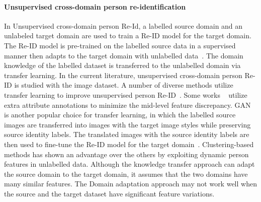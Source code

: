 \documentclass[a4paper,fleqn]{cas-dc}
\begin{document}
\paragraph{Unsupervised cross-domain person re-identification}
In Unsupervised cross-domain person Re-Id, a labelled source domain and an unlabeled target domain are used to train a Re-ID model for the target domain. The Re-ID model is pre-trained on the labelled source data in a supervised manner then adapts to the target domain with unlabelled data~\cite{fan_unsupervised_2018,fu_self-similarity_2019}. The domain knowledge of the labelled dataset is transferred to the unlabelled domain via transfer learning. In the current literature, unsupervised cross-domain person Re-ID is studied with the image dataset. A number of diverse methods  utilize transfer learning to improve unsupervised person Re-ID~\cite{lin_multi-task_2018,wang_transferable_2018,yu_unsupervised_2019,wei_person_2018,deng_image-image_2018,zhong_generalizing_2018,zhong_invariance_2019,chen_instance-guided_2019,wu_unsupervised_2019,li_cross-dataset_2019,qi_novel_2019,zhang_self-training_2019}. Some works ~\cite{lin_multi-task_2018,wang_transferable_2018} utilize extra attribute annotations to minimize the mid-level feature discrepancy. 
GAN is another popular choice for transfer learning, in which the labelled source images are transferred into images with the target image styles while preserving source identity labels. The translated images with the source identity labels are then used to fine-tune the Re-ID model for the target domain~\cite{wei_person_2018,deng_image-image_2018,zhong_generalizing_2018,zhong_invariance_2019,chen_instance-guided_2019}. Clustering-based methods has shown an advantage over the others by exploiting dynamic person features in unlabelled data. Although the knowledge transfer approach can adapt the source domain to the target domain, it assumes that the two domains have many similar features. The Domain adaptation approach may not work well when the source and the target dataset have significant feature variations.
\end{document}
